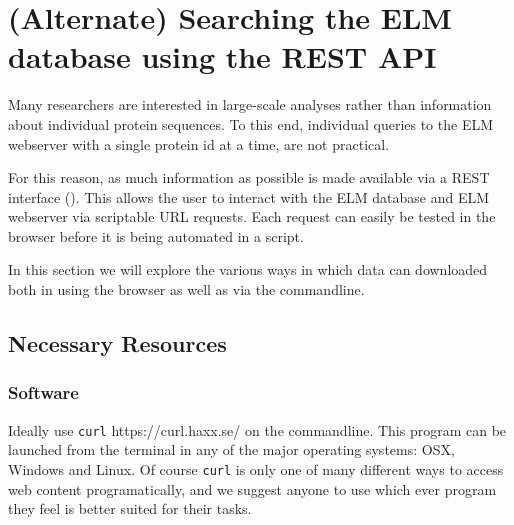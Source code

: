 \section{(Alternate) Searching the ELM database using the REST API}
\label{sec:search_REST}

Many researchers are interested in large-scale analyses rather than
information about individual protein sequences. To this end, individual
queries to the ELM webserver with a single protein id at a time, are not
practical.

For this reason, as much information as possible is made available via a
REST interface (\cite{Fielding2002}). This allows the user to interact
with the ELM database and ELM webserver via scriptable URL requests.
Each request can easily be tested in the browser before it is being
automated in a script.

In this section we will explore the various ways in which data can
downloaded both in using the browser as well as via the commandline.

%
%
\subsection{Necessary Resources}\label{necessary-resources-3}

\subsubsection{Software}\label{software-1}

Ideally use \texttt{curl} https://curl.haxx.se/ on the commandline. This
program can be launched from the terminal in any of the major operating
systems: OSX, Windows and Linux. Of course \texttt{curl} is only one of
many different ways to access web content programatically, and we
suggest anyone to use which ever program they feel is better suited for
their tasks.

